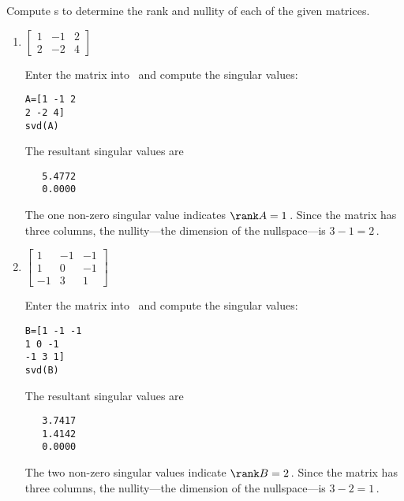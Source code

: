 \begin{example} \label{eg:}
Compute \svd{}s to determine the rank and nullity of each of the given matrices.
\begin{enumerate}
\item \(\begin{bmatrix} 1&-1&2
\\2&-2&4
 \end{bmatrix}\)
\begin{solution} 
Enter the matrix into \script\ and compute the singular values:
\begin{verbatim}
A=[1 -1 2
2 -2 4]
svd(A)
\end{verbatim}
\setbox\ajrqrbox\hbox{}%
\marginpar{\usebox{\ajrqrbox}}%
The resultant singular values are
\begin{verbatim}
   5.4772
   0.0000
\end{verbatim}
The one non-zero singular value indicates \(\rank A=1\)\,.
Since the matrix has three columns, the nullity---the dimension of the nullspace---is \(3-1=2\)\,. 
\end{solution}
 
\item \(\begin{bmatrix} 1&-1&-1
\\1&0&-1
\\-1&3&1 \end{bmatrix}\)
\begin{solution} 
Enter the matrix into \script\ and compute the singular values:
\begin{verbatim}
B=[1 -1 -1
1 0 -1
-1 3 1]
svd(B)
\end{verbatim}
\setbox\ajrqrbox\hbox{}%
\marginpar{\usebox{\ajrqrbox}}%
The resultant singular values are
\begin{verbatim}
   3.7417
   1.4142
   0.0000
\end{verbatim}
The two non-zero singular values indicate  \(\rank B=2\)\,.
Since the matrix has three columns, the nullity---the dimension of the nullspace---is \(3-2=1\)\,. 
\end{solution}



\end{enumerate}
\end{example}
